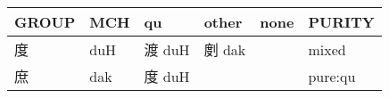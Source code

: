\documentclass[14pt,a4paper]{scrartcl}
\begin{document}
\begin{longtable}[c]{@{}llllll@{}}
\toprule
\begin{minipage}[b]{0.14\columnwidth}\raggedright\strut
GROUP
\strut\end{minipage} &
\begin{minipage}[b]{0.14\columnwidth}\raggedright\strut
MCH
\strut\end{minipage} &
\begin{minipage}[b]{0.14\columnwidth}\raggedright\strut
qu
\strut\end{minipage} &
\begin{minipage}[b]{0.14\columnwidth}\raggedright\strut
other
\strut\end{minipage} &
\begin{minipage}[b]{0.14\columnwidth}\raggedright\strut
none
\strut\end{minipage} &
\begin{minipage}[b]{0.14\columnwidth}\raggedright\strut
PURITY
\strut\end{minipage}\tabularnewline
\midrule
\endhead
\begin{minipage}[t]{0.14\columnwidth}\raggedright\strut
度
\strut\end{minipage} &
\begin{minipage}[t]{0.14\columnwidth}\raggedright\strut
duH
\strut\end{minipage} &
\begin{minipage}[t]{0.14\columnwidth}\raggedright\strut
渡 duH
\strut\end{minipage} &
\begin{minipage}[t]{0.14\columnwidth}\raggedright\strut
剫 dak
\strut\end{minipage} &
\begin{minipage}[t]{0.14\columnwidth}\raggedright\strut
\strut\end{minipage} &
\begin{minipage}[t]{0.14\columnwidth}\raggedright\strut
mixed
\strut\end{minipage}\tabularnewline
\begin{minipage}[t]{0.14\columnwidth}\raggedright\strut
庶
\strut\end{minipage} &
\begin{minipage}[t]{0.14\columnwidth}\raggedright\strut
dak
\strut\end{minipage} &
\begin{minipage}[t]{0.14\columnwidth}\raggedright\strut
度 duH
\strut\end{minipage} &
\begin{minipage}[t]{0.14\columnwidth}\raggedright\strut
\strut\end{minipage} &
\begin{minipage}[t]{0.14\columnwidth}\raggedright\strut
\strut\end{minipage} &
\begin{minipage}[t]{0.14\columnwidth}\raggedright\strut
pure:qu
\strut\end{minipage}\tabularnewline
\bottomrule
\end{longtable}
\end{document}
